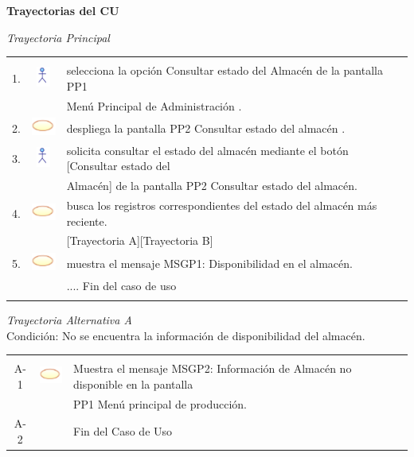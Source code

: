 \documentclass[10pt,spanish]{article}
\providecommand{\tabularnewline}{\\}
\begin{document}
	\textbf{\large Trayectorias del CU}{\large \par}

	\textit{\large Trayectoria Principal}{\large{} }{\large \par}

	\begin{tabular}{ccl}
	&  & \tabularnewline
	1. & \includegraphics{actor} & selecciona la opción Consultar estado del Almacén de la pantalla PP1\tabularnewline	
    & & Menú Principal de Administración .\tabularnewline	
	2. & \includegraphics{sistema} & despliega la pantalla PP2 Consultar estado del almacén .\tabularnewline		
	3. & \includegraphics{actor} & solicita consultar el estado del almacén mediante el botón [Consultar estado del\tabularnewline
	& & Almacén] de la pantalla PP2 Consultar estado del almacén.\tabularnewline
	4. & \includegraphics{sistema} &  busca los registros correspondientes del estado del almacén más reciente. \tabularnewline
	& & [Trayectoria A][Trayectoria B]\tabularnewline
	5. & \includegraphics{sistema} & muestra el mensaje MSGP1: Disponibilidad en el almacén.\tabularnewline
	 &  & .... Fin del caso de uso\tabularnewline \\
	\end{tabular}
	\newpage
	\textit{Trayectoria Alternativa A}\\
	Condición: No se encuentra la información de disponibilidad del almacén.\\
	\begin{tabular}{ccl}
	& & \tabularnewline
	A-1 & \includegraphics{sistema} & Muestra el mensaje MSGP2: Información de Almacén no disponible en la pantalla \tabularnewline
	& & PP1 Menú principal de producción.\tabularnewline
	A-2 & & Fin del Caso de Uso\tabularnewline
	\end{tabular}
\end{document}

